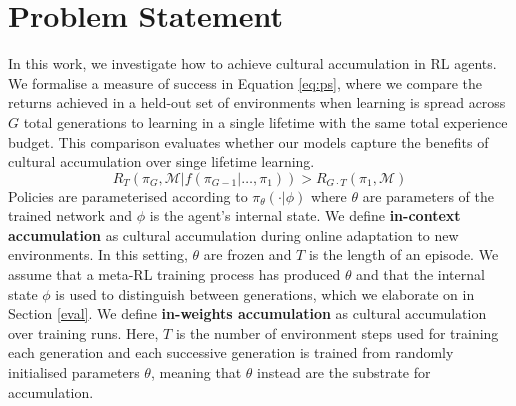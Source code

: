 \documentclass{article}
\begin{document}
\section{Problem Statement}
\label{sec:statement}
In this work, we investigate how to achieve cultural accumulation in RL agents. We formalise a measure of success in Equation \ref{eq:ps}, where we compare the returns achieved in a held-out set of environments when learning is spread across $G$ total generations to learning in a single lifetime with the same total experience budget. This comparison evaluates whether our models capture the benefits of cultural accumulation over singe lifetime learning.
\begin{equation}
\label{eq:ps}
R_{T}(\pi_G, \mathcal{M} | f(\pi_{G-1} | \dots, \pi_1)) > R_{G \cdot T}(\pi_1, \mathcal{M})
\end{equation}
Policies are parameterised according to $\pi_\theta(\cdot | \phi)$ where $\theta$ are parameters of the trained network and $\phi$ is the agent's internal state. We define \textbf{in-context accumulation} as cultural accumulation during online adaptation to new environments. In this setting, $\theta$ are frozen and $T$ is the length of an episode. We assume that a meta-RL training process has produced $\theta$ and that the internal state $\phi$ is used to distinguish between generations, which we elaborate on in Section \ref{eval}. We define \textbf{in-weights accumulation} as cultural accumulation over training runs. Here, $T$ is the number of environment steps used for training each generation and each successive generation is trained from randomly initialised parameters $\theta$, meaning that $\theta$ instead are the substrate for accumulation.
\end{document}
